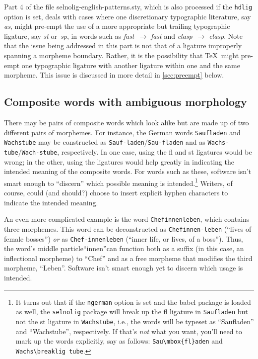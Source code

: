 \documentclass[11pt]{article}
\newcommand{\pkg}[1]{\textsf{#1}}
\newcommand{\opt}[1]{\texttt{#1}}
\begin{document}
Part 4 of the file \pkg{selnolig-english-patterns.sty}, which is also processed if the \opt{hdlig} option is set, deals with cases where one discretionary typographic literature, say \emph{as}, might pre-empt the use of a more appropriate but trailing typographic ligature, say \emph{st} or~\emph{sp}, in words such as \emph{f\mbox{as}t}~$\to$ \emph{fa\mbox{st}} and \emph{cl\mbox{as}p}~$\to$ \emph{cla\mbox{sp}}. Note that the issue being addressed in this part is not that of a ligature improperly spanning a morpheme boundary. Rather, it is the possibility that \TeX\ might pre-empt one typographic ligature with another ligature within one and the same morpheme. This issue is discussed in more detail in \cref{sec:preempt} below.

\subsection{Composite words with ambiguous morphology}

There may be pairs of composite words which look alike but are made up of two different pairs of morphemes. For instance, the German words \opt{Saufladen} and \opt{Wachstube} may be constructed as \opt{Sauf-laden}\slash \opt{Sau-fladen} and as \opt{Wachs-tube}\slash \opt{Wach-stube}, respectively. In one case, using the fl and st ligatures would be wrong; in the other, using the ligatures would help greatly in indicating the intended meaning of the composite words. 
For words such as these, software isn't smart enough to \enquote{discern} which possible meaning is intended.\footnote{It turns out that if the \opt{ngerman} option is set and the \pkg{babel} package is loaded as well, the \opt{selnolig} package will break up the fl ligature in \opt{Saufladen} but not the st ligature in \opt{Wachstube}, i.e., the words will be typeset as \enquote{Saufladen} and \enquote{Wachstube}, respectively. If that's \emph{not} what you want, you'll need to mark up the words explicitly, say as follows: \Verb+Sau\mbox{fl}aden+ and \Verb+Wachs\breaklig tube+. } Writers, of course, could (and should?) choose to insert explicit hyphen characters to indicate the intended meaning.

An even more complicated example is the word \opt{Chefinnenleben}, which contains three morphemes. This word can be deconstructed as \opt{Chefinnen-leben} (\enquote{lives of female bosses}) \emph{or} as \opt{Chef-innenleben} (\enquote{inner life, or lives, of a boss}). Thus, the word's middle particle\textemdash\enquote{innen}\textemdash can function both as a suffix (in this case, an inflectional morpheme) to \enquote{Chef} and as a free morpheme that modifies the third morpheme, \enquote{Leben}. Software isn't smart enough yet to discern which usage is intended.
\end{document}
